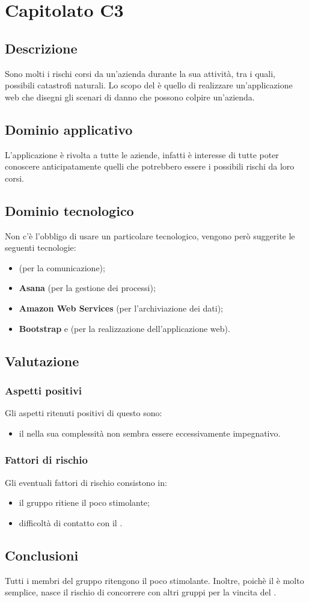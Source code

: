 \section {Capitolato C3}
	\subsection {Descrizione}
		Sono molti i rischi corsi da un'azienda durante la sua attività, tra i quali, possibili catastrofi naturali. Lo scopo del  è quello di realizzare un'applicazione web che disegni gli scenari di
		danno che possono colpire un'azienda.
	\subsection {Dominio applicativo}
		L'applicazione è rivolta a tutte le aziende, infatti è interesse di tutte poter conoscere anticipatamente quelli che potrebbero essere i possibili rischi da loro corsi.
	\subsection {Dominio tecnologico}
		Non c'è l'obbligo di usare un particolare  tecnologico, vengono però suggerite le seguenti tecnologie:
		\begin{itemize}
			\item \textbf{} (per la comunicazione);
			\item \textbf{Asana} (per la gestione dei processi);
			\item \textbf{Amazon Web Services} (per l'archiviazione dei dati);
			\item \textbf{Bootstrap} e \textbf{} (per la realizzazione dell'applicazione web).
		\end{itemize}
	\subsection {Valutazione}
		\subsubsection {Aspetti positivi}
		Gli aspetti ritenuti positivi di questo  sono:
			\begin{itemize}
				\item il  nella sua complessità non sembra essere eccessivamente impegnativo.
			\end{itemize}
		\subsubsection {Fattori di rischio}
		Gli eventuali fattori di rischio consistono in:
			\begin{itemize}
				\item il gruppo ritiene il  poco stimolante;
				\item difficoltà di contatto con il .
			\end{itemize}
	\subsection {Conclusioni}
		Tutti i membri del gruppo ritengono il  poco stimolante. Inoltre, poichè il  è molto semplice, nasce il rischio di concorrere con altri gruppi per la vincita del .